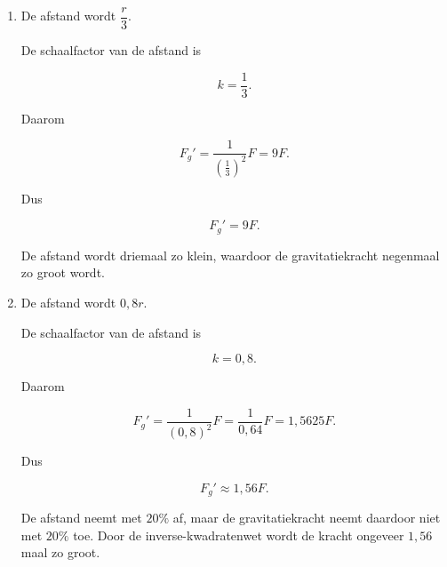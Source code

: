 \documentclass{ximera}
\begin{document}
\begin{oefening}{\oefU\ESS}
\begin{oplossing}
\begin{enumerate}
        \[
        k=5.
        \]
      
        Daarom
      
        \[
        F_g'
        =
        \frac{1}{5^2}F
        =
        \boxed{\frac1{25}F}.
        \]
      
        De afstand wordt vijfmaal zo groot, waardoor de gravitatiekracht
        $25$ maal zo klein wordt.
      
      
        \item De afstand wordt $\dfrac r3$.
      
        De schaalfactor van de afstand is
      
        \[
        k=\frac13.
        \]
      
        Daarom
      
        \[
        F_g'
        =
        \frac{1}{\left(\frac13\right)^2}F
        =
        9F.
        \]
      
        Dus
      
        \[
        \boxed{F_g'=9F}.
        \]
      
        De afstand wordt driemaal zo klein, waardoor de gravitatiekracht
        negenmaal zo groot wordt.
      
      
        \item De afstand wordt $0{,}8r$.
      
        De schaalfactor van de afstand is
      
        \[
        k=0{,}8.
        \]
      
        Daarom
      
        \[
        F_g'
        =
        \frac{1}{(0{,}8)^2}F
        =
        \frac{1}{0{,}64}F
        =
        1{,}5625F.
        \]
      
        Dus
      
        \[
        \boxed{
        F_g'\approx1{,}56F.
        }
        \]
      
        De afstand neemt met $20\%$ af, maar de gravitatiekracht neemt
        daardoor niet met $20\%$ toe. Door de inverse-kwadratenwet wordt
        de kracht ongeveer $1{,}56$ maal zo groot.
      
      \end{enumerate}
      
      \end{oplossing}

\end{oefening}
\end{document}
